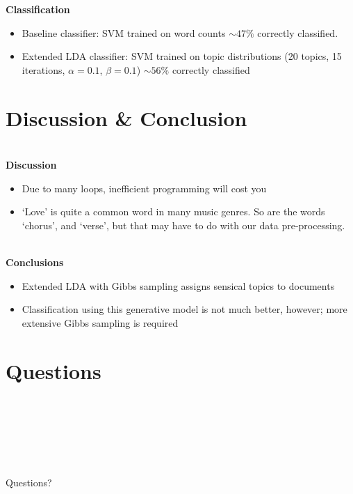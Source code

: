 \documentclass[t,ignorenonframetext]{beamer}
\begin{document}
\begin{frame}
\textbf{Classification}
\begin{itemize}
	\item Baseline classifier: SVM trained on word counts $\sim 47 \%$ correctly classified.
	\item Extended LDA classifier: SVM trained on topic distributions (20 topics, 15 iterations, $\alpha=0.1$, $\beta=0.1$) $\sim 56 \%$ correctly classified
\end{itemize}

\end{frame}

\section{Discussion \& Conclusion}
\begin{frame}~\\
\textbf{Discussion}~\\
\begin{itemize}
	\item Due to many loops, inefficient programming will cost you
	\item `Love' is quite a common word in many music genres. So are the words `chorus', and `verse', but that may have to do with our data pre-processing.
\end{itemize}~\\
\textbf{Conclusions}~\\
\begin{itemize}
\setlength{\itemsep}{10pt}\setlength{\itemsep}{5pt}
\item Extended LDA with Gibbs sampling assigns sensical topics to documents
\item Classification using this generative model is not much better, however; more extensive Gibbs sampling is required 

\end{itemize}
\end{frame}

\section[Questions]{Questions}
\begin{frame}
~ \\~ \\~ \\ ~ \\~ \\
\begin{center}\Huge Questions? \end{center} 
\end{frame}
\end{document}

